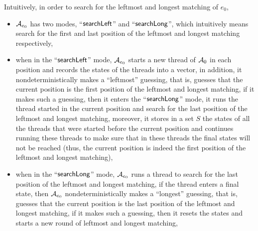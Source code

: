%
Intuitively, in order to search for the leftmost and longest matching of $e_0$, 
\begin{itemize}
\item $\mathcal{A}_{e_0}$ has two modes, ``$\mathsf{searchLeft}$'' and ``$\mathsf{searchLong}$'', which intuitively means search for the first and last position of the leftmost and longest matching respectively,
	\item when in the ``$\mathsf{searchLeft}$'' mode, $\mathcal{A}_{e_0}$ starts a new thread of $\mathcal{A}_0$ in each position and records the states of the threads into a vector, in addition, it nondeterministically makes a ``leftmost'' guessing, that is, guesses that the current position is the first position of the leftmost and longest matching, if it makes such a guessing, then it enters the ``$\mathsf{searchLong}$'' mode, it runs the thread started in the current position and search for the last position of the leftmost and longest matching, moreover, it stores in a set $S$ the states of all the threads that were started before the current position  and continues running these threads to make sure that in these threads the final states will not be reached (thus, the current position is indeed the first position of the leftmost and longest matching),
	\item when in the ``$\mathsf{searchLong}$'' mode, $\mathcal{A}_{e_0}$ runs a thread to search for the last position of the leftmost and longest matching, if the thread enters a final state, then $\mathcal{A}_{e_0}$ nondeterministically makes a ``longest'' guessing, that is, guesses that the current position is the last position of the leftmost and longest matching, if it makes such a guessing, then it resets the states and starts a new round of leftmost and longest matching,
%

\end{itemize}
